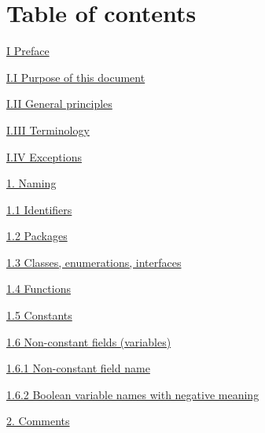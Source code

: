 \section*{Table of contents}

\hspace{0.0cm}\hyperref[sec:]{I Preface}

\hspace{0.5cm}\hyperref[sec:]{ I.I Purpose of this document}

\hspace{0.5cm}\hyperref[sec:]{ I.II General principles}

\hspace{0.5cm}\hyperref[sec:]{ I.III Terminology}

\hspace{0.5cm}\hyperref[sec:]{ I.IV Exceptions}

\hspace{0.0cm}\hyperref[sec:]{}

\hspace{0.0cm}\hyperref[sec:1.]{1. Naming}

\hspace{0.0cm}\hyperref[sec:]{}

\hspace{0.5cm}\hyperref[sec:1.1]{ 1.1 Identifiers}

\hspace{0.5cm}\hyperref[sec:1.2]{ 1.2 Packages}

\hspace{0.5cm}\hyperref[sec:1.3]{ 1.3 Classes, enumerations, interfaces}

\hspace{0.5cm}\hyperref[sec:1.4]{ 1.4 Functions}

\hspace{0.5cm}\hyperref[sec:1.5]{ 1.5 Constants}

\hspace{0.5cm}\hyperref[sec:1.6]{ 1.6 Non-constant fields (variables)}

\hspace{1.0cm}\hyperref[sec:1.6.1]{ 1.6.1 Non-constant field name}

\hspace{1.0cm}\hyperref[sec:1.6.2]{ 1.6.2 Boolean variable names with negative meaning}

\hspace{0.0cm}\hyperref[sec:]{}

\hspace{0.0cm}\hyperref[sec:2.]{2. Comments}

